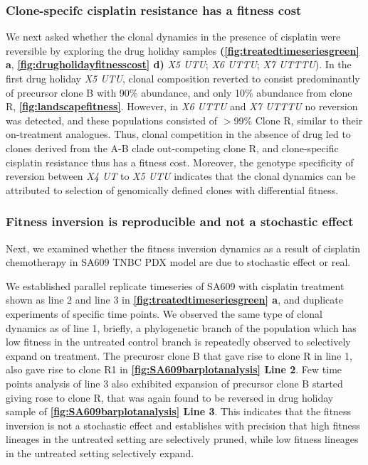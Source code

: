 

\subsubsection {Clone-specifc cisplatin resistance has a fitness cost}
We next asked whether the clonal dynamics in the presence of cisplatin were reversible by exploring the drug holiday samples \textbf{(\autoref{fig:treatedtimeseriesgreen} a}, \textbf{\autoref{fig:drugholidayfitnesscost} d)} \textit{X5 UTU}; \textit{X6 UTTU}; \textit{X7 UTTTU}). In the first drug holiday \textit{X5 UTU}, clonal composition reverted to consist predominantly of precursor clone B with 90\% abundance, and only 10\% abundance from clone R, \textbf{\autoref{fig:landscapefitness}}.  However, in \textit{X6 UTTU} and \textit{X7 UTTTU} no reversion was detected, and these populations consisted of  $>$99\% Clone R, similar to their on-treatment analogues. Thus, clonal competition in the absence of drug led to clones derived from the A-B clade out-competing clone R, and clone-specific cisplatin resistance thus has a fitness cost. Moreover, the genotype specificity of reversion between \textit{X4 UT} to \textit{X5 UTU} indicates that the clonal dynamics can be attributed to selection of genomically defined clones with differential fitness. 


\subsubsection{Fitness inversion is reproducible and not a stochastic effect}
Next, we examined whether the fitness inversion dynamics as a result of cisplatin chemotherapy in SA609 TNBC PDX model are due to stochastic effect or real.

We established parallel replicate timeseries of SA609 with cisplatin treatment shown as line 2 and line 3 in \textbf{\autoref{fig:treatedtimeseriesgreen} a}, and duplicate experiments of specific time points. We observed the same type of clonal dynamics as of line 1, briefly, a phylogenetic branch of the population which has low fitness in the untreated control branch is repeatedly observed to selectively expand on treatment. The precurosr clone B that gave rise to clone R in line 1, also gave rise to clone R1 in \textbf{\autoref{fig:SA609barplotanalysis} Line 2}. Few time points analysis of line 3 also exhibited expansion of precursor clone B started giving rose to clone R, that was again found to be reversed in drug holiday sample of \textbf{\autoref{fig:SA609barplotanalysis} Line 3}. This indicates that the fitness inversion is not a stochastic effect and establishes with precision that high fitness lineages in the untreated setting are selectively pruned, while low fitness lineages in the untreated setting selectively expand.

